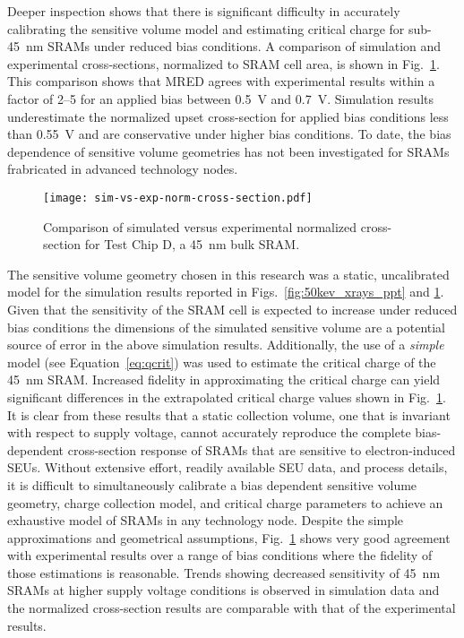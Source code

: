 Deeper inspection shows that there is significant difficulty in accurately calibrating the sensitive volume model and estimating critical charge for sub-45~nm SRAMs under reduced bias conditions.
A comparison of simulation and experimental cross-sections, normalized to SRAM cell area, is shown in Fig.~\ref{fig:sim-vs-exp-norm-cross-section}.
This comparison shows that MRED agrees with experimental results within a factor of 2--5 for an applied bias between 0.5~V and 0.7~V.
Simulation results underestimate the normalized upset cross-section for applied bias conditions less than 0.55~V and are conservative under higher bias conditions.
To date, the bias dependence of sensitive volume geometries has not been investigated for SRAMs frabricated in advanced technology nodes.

\begin{figure}[tb]
    \begin{center}
        \texttt{[image: sim-vs-exp-norm-cross-section.pdf]}
    \end{center}
    \caption{Comparison of simulated versus experimental normalized cross-section for Test Chip D, a 45~nm bulk SRAM.}
    \label{fig:sim-vs-exp-norm-cross-section}
\end{figure}

The sensitive volume geometry chosen in this research was a static, uncalibrated model for the simulation results reported in Figs.~\ref{fig:50kev_xrays_ppt} and \ref{fig:sim-vs-exp-norm-cross-section}.
Given that the sensitivity of the SRAM cell is expected to increase under reduced bias conditions the dimensions of the simulated sensitive volume are a potential source of error in the above simulation results.
Additionally, the use of a \emph{simple} model (see Equation~\ref{eq:qcrit}) was used to estimate the critical charge of the 45~nm SRAM.
Increased fidelity in approximating the critical charge can yield significant differences in the extrapolated critical charge values shown in Fig.~\ref{fig:sim-vs-exp-norm-cross-section}.
It is clear from these results that a static collection volume, one that is invariant with respect to supply voltage, cannot accurately reproduce the complete bias-dependent cross-section response of SRAMs that are sensitive to electron-induced SEUs.
Without extensive effort, readily available SEU data, and process details, it is difficult to simultaneously calibrate a bias dependent sensitive volume geometry, charge collection model, and critical charge parameters to achieve an exhaustive model of SRAMs in any technology node.
Despite the simple approximations and geometrical assumptions, Fig.~\ref{fig:sim-vs-exp-norm-cross-section} shows very good agreement with experimental results over a range of bias conditions where the fidelity of those estimations is reasonable.
Trends showing decreased sensitivity of 45~nm SRAMs at higher supply voltage conditions is observed in simulation data and the normalized cross-section results are comparable with that of the experimental results.

